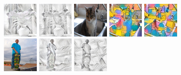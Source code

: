 \documentclass[runningheads]{llncs}
\begin{document}
\begin{figure}
  \includegraphics[width=0.16\textwidth]{1003_sketch_baseline.jpg}
  \includegraphics[width=0.16\textwidth]{1003_sketch_mine.jpg}
  \includegraphics[width=0.16\textwidth]{413_orig.jpg}
  \includegraphics[width=0.16\textwidth]{413_simpsons_baseline.jpg}
  \includegraphics[width=0.16\textwidth]{413_simpsons_mine.jpg} \\
  \includegraphics[width=0.16\textwidth]{618_orig.jpg}
  \includegraphics[width=0.16\textwidth]{618_sketch_baseline.jpg}
  \includegraphics[width=0.16\textwidth]{618_sketch_mine.jpg} 

\end{figure}
\end{document}

